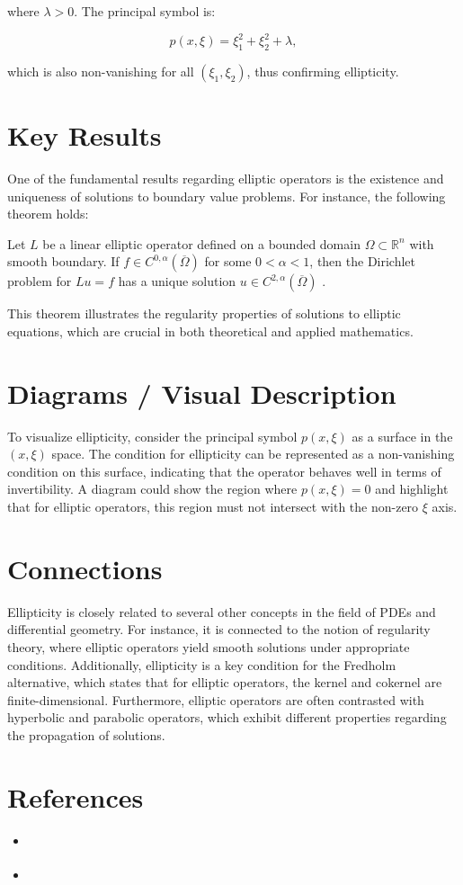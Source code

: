\documentclass[11pt,a4paper]{article}
\begin{document}
where \(\lambda > 0\). The principal symbol is:

\begin{equation}
p(x, \xi) = \xi_1^2 + \xi_2^2 + \lambda,
\end{equation}

which is also non-vanishing for all \((\xi_1, \xi_2)\), thus confirming ellipticity.

\section{Key Results}
One of the fundamental results regarding elliptic operators is the existence and uniqueness of solutions to boundary value problems. For instance, the following theorem holds:

\begin{theorem}
Let \(L\) be a linear elliptic operator defined on a bounded domain \(\Omega \subset \mathbb{R}^n\) with smooth boundary. If \(f \in C^{0,\alpha}(\overline{\Omega})\) for some \(0 < \alpha < 1\), then the Dirichlet problem for \(Lu = f\) has a unique solution \(u \in C^{2,\alpha}(\overline{\Omega})\) \cite{arxiv:2601.19274v4}.

\end{theorem}

This theorem illustrates the regularity properties of solutions to elliptic equations, which are crucial in both theoretical and applied mathematics.

\section{Diagrams / Visual Description}
To visualize ellipticity, consider the principal symbol \(p(x, \xi)\) as a surface in the \((x, \xi)\) space. The condition for ellipticity can be represented as a non-vanishing condition on this surface, indicating that the operator behaves well in terms of invertibility. A diagram could show the region where \(p(x, \xi) = 0\) and highlight that for elliptic operators, this region must not intersect with the non-zero \(\xi\) axis.

\section{Connections}
Ellipticity is closely related to several other concepts in the field of PDEs and differential geometry. For instance, it is connected to the notion of regularity theory, where elliptic operators yield smooth solutions under appropriate conditions. Additionally, ellipticity is a key condition for the Fredholm alternative, which states that for elliptic operators, the kernel and cokernel are finite-dimensional. Furthermore, elliptic operators are often contrasted with hyperbolic and parabolic operators, which exhibit different properties regarding the propagation of solutions.

\section{References}
\begin{itemize}
    \item \cite{arxiv:2601.19274v4}
    \item \cite{arxiv:2602.19251v1}
\end{itemize}
\end{document}
